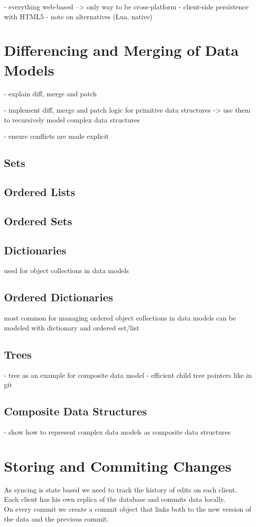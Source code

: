 - everything web-based --> only way to be cross-platform
- client-side persistence with HTML5
- note on alternatives (Lua, native)

\section{Differencing and Merging of Data Models}
- explain diff, merge and patch

- implement diff, merge and patch logic for primitive data structures
  -> use them to recursively model complex data structures

- ensure conflicts are made explicit

\subsection{Sets}
\subsection{Ordered Lists}
\subsection{Ordered Sets}
\subsection{Dictionaries}
used for object collections in data models
\subsection{Ordered Dictionaries}
most common for managing ordered object collections in data models
can be modeled with dictionary and ordered set/list
\subsection{Trees}
- tree as an example for composite data model
- efficient child tree pointers like in git

\subsection{Composite Data Structures}
- show how to represent complex data models as composite data structures

\section{Storing and Commiting Changes}
As syncing is state based we need to track the history of edits on each client.\\Each client has his own replica of the database and commits
data locally.\\On every commit we create a commit object that links both
to the new version of the data and the previous commit.\\

